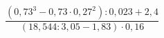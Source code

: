\begin{ex}[type=calculate]
	\begin{condition}
		\( \dfrac{(0,73^3-0,73\cdot0,27^2):0,023+2,4}{(18,544:3,05-1,83)\cdot0,16} \)
	\end{condition}
\end{ex}